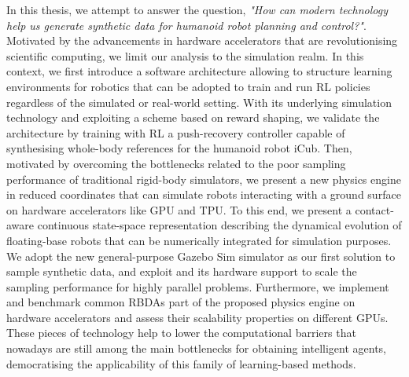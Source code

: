 In this thesis, we attempt to answer the question,
\textit{"How can modern technology help us generate synthetic data for humanoid robot planning and control?"}.\linebreak
Motivated by the advancements in hardware accelerators that are revolutionising scientific computing, we limit our analysis to the simulation realm.
In this context, we first introduce a software architecture allowing to structure learning environments for robotics that can be adopted to train and run \ac{RL} policies regardless of the simulated or real-world setting.
With its underlying simulation technology and exploiting a scheme based on reward shaping, we validate the architecture by
training with \ac{RL} a push-recovery controller capable of synthesising whole-body references for the humanoid robot iCub.
Then, motivated by overcoming the bottlenecks related to the poor sampling performance of traditional rigid-body simulators, we present a new physics engine in reduced coordinates that can simulate robots interacting with a ground surface on hardware accelerators like \ac{GPU} and \ac{TPU}.
To this end, we present a contact-aware continuous state-space representation describing the dynamical evolution of floating-base robots that can be numerically integrated for simulation purposes.
We adopt the new general-purpose Gazebo Sim simulator as our first solution to sample synthetic data, and exploit \jax and its hardware support to scale the sampling performance for highly parallel problems.
Furthermore, we implement and benchmark common \acp{RBDA} part of the proposed physics engine on hardware accelerators and assess their scalability properties on different \acp{GPU}.
These pieces of technology help to lower the computational barriers that nowadays are still among the main bottlenecks for obtaining intelligent agents, democratising the applicability of this family of learning-based methods.

\vfill

\endgroup

\vfill
